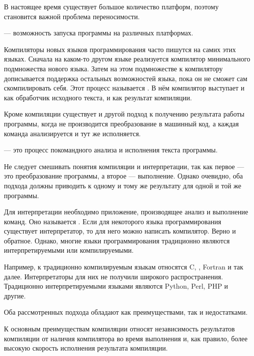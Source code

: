 В настоящее время существует большое количество платформ, поэтому
становится важной проблема переносимости.

\begin{defn}
   — возможность запуска программы на различных
  платформах.
\end{defn}

Компиляторы новых языков программирования часто пишутся на самих этих
языках. Сначала на каком-то другом языке реализуется компилятор
минимального подмножества нового языка. Затем на этом подмножестве к
компилятору дописывается поддержка остальных возможностей языка, пока
он не сможет сам скомпилировать себя. Этот процесс называется
. В нём компилятор
выступает и как обработчик исходного текста, и как результат
компиляции.

Кроме компиляции существует и другой подход к получению результата
работы программы, когда не производится преобразование в машинный
код, а каждая команда анализируется и тут же исполняется.

\begin{defn}
   — это процесс покомандного
  анализа и исполнения текста программы.
\end{defn}

Не следует смешивать понятия компиляции и интерпретации, так как первое
— это преобразование программы, а второе — выполнение. Однако очевидно,
оба подхода должны приводить к одному и тому же результату для одной
и той же программы.

Для интерпретации необходимо приложение, производящее анализ и
выполнение команд. Оно называется
. Если для некоторого языка
программирования существует интерпретатор, то для него можно написать
компилятор. Верно и обратное. Однако, многие языки программирования
традиционно являются интерпретируемыми или компилируемыми.

Например, к традиционно компилируемым языкам относятся C, \CPP, Fortran
и так далее. Интерпретаторы для них не получили широкого распространения.
Традиционно интерпретируемыми языками являются Python, Perl, PHP и
другие.

Оба рассмотренных подхода обладают как преимуществами, так и
недостатками.

К основным преимуществам компиляции относят независимость результатов
компиляции от наличия компилятора во время выполнения и, как правило,
более высокую скорость исполнения результата компиляции.

